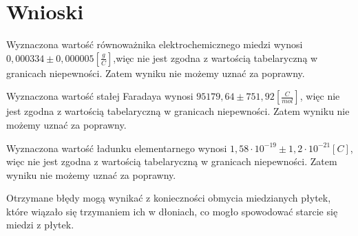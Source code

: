 \documentclass[a4paper,10pt,twoside]{article}
\begin{document}
\section{Wnioski}
Wyznaczona wartość równoważnika elektrochemicznego miedzi wynosi $0,000334 \pm 0,000005 [\frac{g}{C}]$,więc nie jest zgodna z wartością tabelaryczną w granicach niepewności. Zatem wyniku nie możemy uznać za poprawny.

Wyznaczona wartość stałej Faradaya wynosi $95179,64 \pm 751,92 [\frac{C}{mol}]$, więc nie jest zgodna z wartością tabelaryczną w granicach niepewności. Zatem wyniku nie możemy uznać za poprawny.

Wyznaczona wartość ładunku elementarnego wynosi $1,58\cdot10^{-19} \pm 1,2\cdot10^{-21}[C]$, więc nie jest zgodna z wartością tabelaryczną w granicach niepewności. Zatem wyniku nie możemy uznać za poprawny.

Otrzymane błędy mogą wynikać z konieczności obmycia miedzianych płytek, które wiązało się trzymaniem ich w dłoniach, co mogło spowodować starcie się miedzi z płytek.
\end{document}

